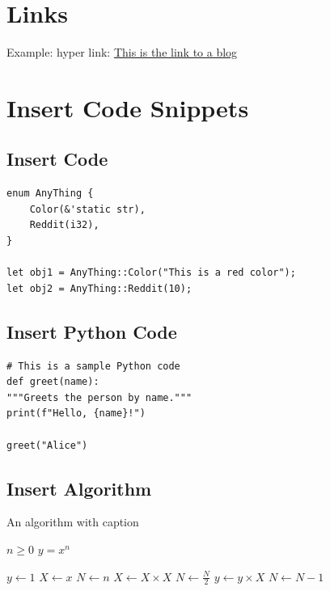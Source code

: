\documentclass[letterpaper, oneside]{book}
\begin{document}
\section{Links}

Example: hyper link:  \href{https://news.ycombinator.com/news}{This is the link to a blog}



\section{Insert Code Snippets}

\subsection{Insert Code}

\begin{lstlisting}
enum AnyThing {
    Color(&'static str),
    Reddit(i32),
}

let obj1 = AnyThing::Color("This is a red color");
let obj2 = AnyThing::Reddit(10);

\end{lstlisting}



\subsection{Insert Python Code}

\begin{lstlisting}[style=python]
# This is a sample Python code
def greet(name):
"""Greets the person by name."""
print(f"Hello, {name}!")

greet("Alice")
\end{lstlisting}

\subsection{Insert Algorithm}

\begin{algorithm}
	\caption{An algorithm with caption}\label{alg:cap}

	\begin{algorithmic}[1]
		\Require $n \geq 0$
		\Ensure $y = x^n$

		\State $y \gets 1$
		\State $X \gets x$
		\State $N \gets n$
		\State $X \gets X \times X$
		\State $N \gets \frac{N}{2}$  
		\State $y \gets y \times X$
		\State $N \gets N - 1$
		\EndIf
		\EndWhile


	\end{algorithmic}
\end{algorithm}
\end{document}
